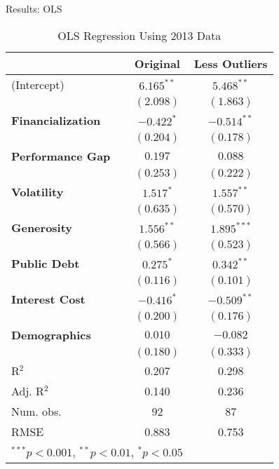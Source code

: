 \documentclass{beamer}
\begin{document}
\begin{frame}{\textmd{Results: OLS}}
\begin{table}
\begin{tiny}
\caption{OLS Regression Using 2013 Data}
\begin{center}
\begin{tabular}{lcc}
\hline
 & Original & Less Outliers \\
\hline
(Intercept) & $6.165^{**}$ & $5.468^{**}$  \\
            & $(2.098)$             & $(1.863)$              \\
\textbf{Financialization}      & $\mathbf{-0.422}^{*}$ & $\mathbf{-0.514}^{**}$ \\
            & $(0.204)$             & $(0.178)$              \\
\textbf{Performance Gap}    & $0.197$               & $0.088$                \\
            & $(0.253)$             & $(0.222)$              \\
\textbf{Volatility}        & $\mathbf{1.517}^{*}$  & $\mathbf{1.557}^{**}$  \\
            & $(0.635)$             & $(0.570)$              \\
\textbf{Generosity}    & $\mathbf{1.556}^{**}$ & $\mathbf{1.895}^{***}$ \\
            & $(0.566)$             & $(0.523)$              \\
\textbf{Public Debt}     & $\mathbf{0.275}^{*}$  & $\mathbf{0.342}^{**}$  \\
            & $(0.116)$             & $(0.101)$              \\
\textbf{Interest Cost}    & $\mathbf{-0.416}^{*}$ & $\mathbf{-0.509}^{**}$ \\
            & $(0.200)$             & $(0.176)$              \\
\textbf{Demographics} & $0.010$               & $-0.082$               \\
            & $(0.180)$             & $(0.333)$              \\
\hline
R$^2$       & 0.207                 & 0.298                  \\
Adj. R$^2$  & 0.140                 & 0.236                  \\
Num. obs.   & 92                    & 87                     \\
RMSE        & 0.883                 & 0.753                  \\
\multicolumn{2}{l}{$^{***}p<0.001$, $^{**}p<0.01$, $^{*}p<0.05$} \\
\end{tabular}
\end{center}
\end{tiny}
\end{table}
\end{frame}
	
\end{document}
